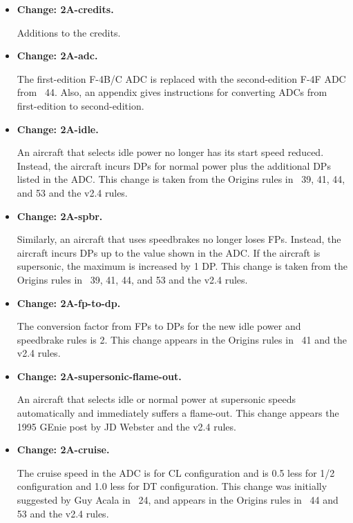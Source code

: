 \documentclass{report}
\newcommand{\changetag}[1]{\textbf{Change: #1.}\par}
\begin{document}
\begin{itemize}

    \item\changetag{2A-credits}

        Additions to the credits.

    \item\changetag{2A-adc}

        The first-edition F-4B/C ADC is replaced with the second-edition F-4F ADC from {\APJ}~44. Also, an appendix gives instructions for converting ADCs from first-edition to second-edition.

    \item\changetag{2A-idle}

        An aircraft that selects idle power no longer has its start speed reduced. Instead, the aircraft incurs DPs for normal power plus the additional DPs listed in the ADC. This change is taken from the Origins rules in {\APJ}~39, 41, 44, and 53 and the v2.4 rules.

    \item\changetag{2A-spbr}

        Similarly, an aircraft that uses speedbrakes no longer loses FPs. Instead, the aircraft incurs DPs up to the value shown in the ADC. If the aircraft is supersonic, the maximum is increased by 1 DP. This change is taken from the Origins rules in {\APJ}~39, 41, 44, and 53 and the v2.4 rules.

    \item\changetag{2A-fp-to-dp}

        The conversion factor from FPs to DPs for the new idle power and speedbrake rules is 2. This change appears in the Origins rules in {\APJ}~41 and the v2.4 rules.

    \item\changetag{2A-supersonic-flame-out}

        An aircraft that selects idle or normal power at supersonic speeds automatically and immediately suffers a flame-out. This change appears the 1995 GEnie post by JD Webster and the v2.4 rules.

    \item\changetag{2A-cruise}

        The cruise speed in the ADC is for CL configuration and is 0.5 less for 1/2 configuration and 1.0 less for DT configuration. This change was initially suggested by Guy Acala in {\APJ}~24, and appears in the Origins rules in {\APJ}~44 and 53 and the v2.4 rules.


\end{itemize}
\end{document}
